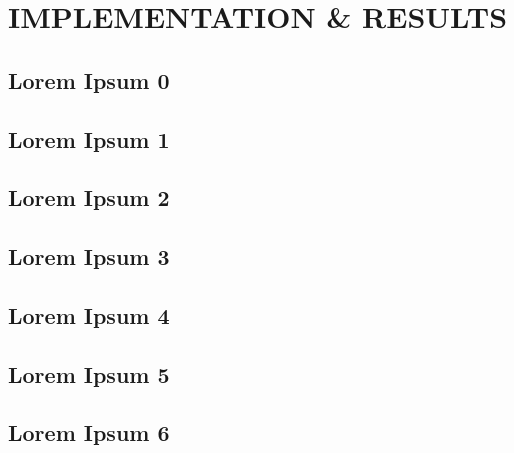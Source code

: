 \chapter{IMPLEMENTATION \& RESULTS}
\minitoc

\section{Lorem Ipsum 0}
\section{Lorem Ipsum 1}
\section{Lorem Ipsum 2}
\section{Lorem Ipsum 3}
\section{Lorem Ipsum 4}
\section{Lorem Ipsum 5}
\section{Lorem Ipsum 6}